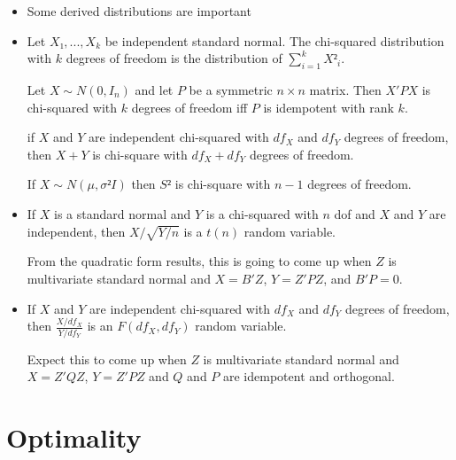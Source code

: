 \begin{itemize}
\item Some derived distributions are important

\item %
  \begin{defn}
    Let $X₁,...,X_k$ be independent standard normal.  The
    chi-squared distribution with $k$ degrees of freedom is the
    distribution of $∑_{i=1}^k X²_i$.
  \end{defn}

  \begin{thm}
    Let $X ∼ N(0, I_n)$ and let $P$ be a symmetric $n × n$ matrix.
    Then $X'PX$ is chi-squared with $k$ degrees of freedom iff $P$ is
    idempotent with rank $k$.
  \end{thm}

  \begin{thm}
    if $X$ and $Y$ are independent chi-squared with $df_X$ and $df_Y$
    degrees of freedom, then $X + Y$ is chi-square with $df_X + df_Y$
    degrees of freedom.
  \end{thm}

  If $X ∼ N(μ, σ² I)$ then $S²$ is chi-square with $n-1$ degrees of
  freedom.

\item %
  \begin{defn}
    If $X$ is a standard normal and $Y$ is a chi-squared with $n$ dof
    and $X$ and $Y$ are independent, then $X / \sqrt{Y/n}$ is a $t(n)$
    random variable.
  \end{defn}
  From the quadratic form results, this is going to come up when $Z$
  is multivariate standard normal and $X = B'Z$, $Y = Z'PZ$, and $B'P
  = 0$.

\item %
  \begin{defn}
    If $X$ and $Y$ are independent chi-squared with $df_X$ and $df_Y$
    degrees of freedom, then $\frac{X/df_X}{Y/df_Y}$ is an $F(df_X,
    df_Y)$ random variable.
  \end{defn}

  Expect this to come up when $Z$ is multivariate standard normal and
  $X = Z'QZ$, $Y = Z'PZ$ and $Q$ and $P$ are idempotent and orthogonal.

\end{itemize}


\section{Optimality}

